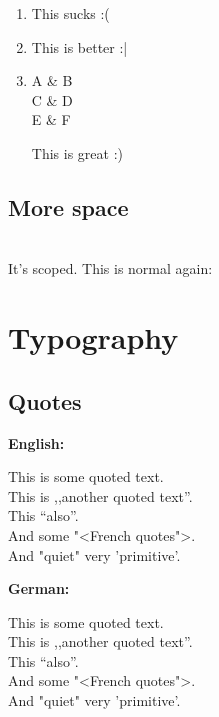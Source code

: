 \documentclass[a4paper, 11pt]{article}
\begin{document}
		    \begin{enumerate}
		    		\item
		    			\makeTable
	
		    			This sucks :(
		    			
		    		\item
	
		    			This is better :|
	    			
		    			
		    		\item
					\begin{adjustbox}{valign=t, tabular=l|l}
						A & B \\
						C & D \\
						E & F
					\end{adjustbox}
					
					This is great :)
		    \end{enumerate}
	    
	    \subsection{More space}
		    {
				\setlength\extrarowheight{5ex}
				\makeTable
			}
			\\[\baselineskip]
			It's scoped. This is normal again:\\
			\makeTable
	    
	    
	\newpage
	\section{Typography}\label{sec:typo}
		\subsection{Quotes}
			\textbf{English:}\\
			\begin{otherlanguage}{english}
				This is \glqq some quoted text\grqq. \\
				This is ,,another quoted text''. \\
				This "`also"'. \\
				And some "<French quotes">. \\
				And "quiet" very 'primitive'.
			\end{otherlanguage}

			\vspace{\baselineskip}			
			\textbf{German:}\\
			\begin{otherlanguage}{ngerman}
				This is \glqq some quoted text\grqq. \\
				This is ,,another quoted text''. \\
				This "`also"'. \\
				And some "<French quotes">. \\
				And "quiet" very 'primitive'.
			\end{otherlanguage}
	    
\end{document}
